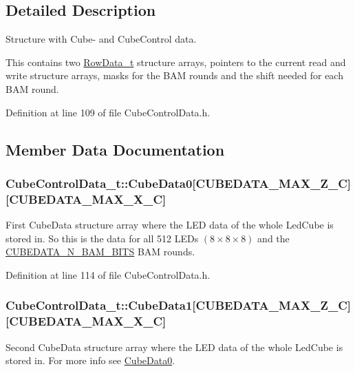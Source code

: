 \subsection{Detailed Description}
Structure with Cube-\/ and Cube\+Control data. 

This contains two \hyperlink{struct_row_data__t}{Row\+Data\+\_\+t} structure arrays, pointers to the current read and write structure arrays, masks for the B\+A\+M rounds and the shift needed for each B\+A\+M round. 

Definition at line 109 of file Cube\+Control\+Data.\+h.



\subsection{Member Data Documentation}
\hypertarget{struct_cube_control_data__t_a4fcbd72fab1f862e17acc3f96efe8d4c}{}
\subsubsection[{Cube\+Data0}]{ Cube\+Control\+Data\+\_\+t\+::\+Cube\+Data0\mbox{[}{\bf C\+U\+B\+E\+D\+A\+T\+A\+\_\+\+M\+A\+X\+\_\+\+Z\+\_\+\+C}\mbox{]}\mbox{[}{\bf C\+U\+B\+E\+D\+A\+T\+A\+\_\+\+M\+A\+X\+\_\+\+X\+\_\+\+C}\mbox{]}}\label{struct_cube_control_data__t_a4fcbd72fab1f862e17acc3f96efe8d4c}
First Cube\+Data structure array where the L\+E\+D data of the whole Led\+Cube is stored in. So this is the data for all 512 L\+E\+Ds $ { (8 \times 8 \times 8) } $ and the \hyperlink{_cube_control_data_8h_ae8163b1995363e0daae4ac54ee4d1dd9}{C\+U\+B\+E\+D\+A\+T\+A\+\_\+\+N\+\_\+\+B\+A\+M\+\_\+\+B\+I\+T\+S} B\+A\+M rounds. 

Definition at line 114 of file Cube\+Control\+Data.\+h.

\hypertarget{struct_cube_control_data__t_a647ae59f9e5f0842d92ef0241db2a141}{}
\subsubsection[{Cube\+Data1}]{ Cube\+Control\+Data\+\_\+t\+::\+Cube\+Data1\mbox{[}{\bf C\+U\+B\+E\+D\+A\+T\+A\+\_\+\+M\+A\+X\+\_\+\+Z\+\_\+\+C}\mbox{]}\mbox{[}{\bf C\+U\+B\+E\+D\+A\+T\+A\+\_\+\+M\+A\+X\+\_\+\+X\+\_\+\+C}\mbox{]}}\label{struct_cube_control_data__t_a647ae59f9e5f0842d92ef0241db2a141}
Second Cube\+Data structure array where the L\+E\+D data of the whole Led\+Cube is stored in. For more info see \hyperlink{struct_cube_control_data__t_a4fcbd72fab1f862e17acc3f96efe8d4c}{Cube\+Data0}. 

